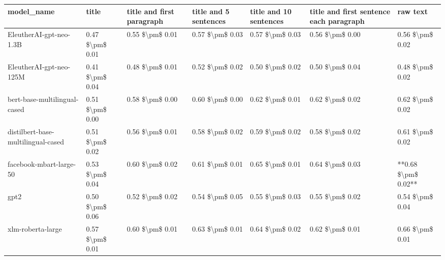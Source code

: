 \begin{tabular}{lllllll}
\toprule
                        model\_name &           title & title and first paragraph & title and 5 sentences & title and 10 sentences & title and first sentence each paragraph &            raw text \\
\midrule
           EleutherAI-gpt-neo-1.3B & 0.47 \$\textbackslash pm\$ 0.01 &           0.55 \$\textbackslash pm\$ 0.01 &       0.57 \$\textbackslash pm\$ 0.03 &        0.57 \$\textbackslash pm\$ 0.03 &                         0.56 \$\textbackslash pm\$ 0.00 &     0.56 \$\textbackslash pm\$ 0.02 \\
           EleutherAI-gpt-neo-125M & 0.41 \$\textbackslash pm\$ 0.04 &           0.48 \$\textbackslash pm\$ 0.01 &       0.52 \$\textbackslash pm\$ 0.02 &        0.50 \$\textbackslash pm\$ 0.02 &                         0.50 \$\textbackslash pm\$ 0.04 &     0.48 \$\textbackslash pm\$ 0.02 \\
      bert-base-multilingual-cased & 0.51 \$\textbackslash pm\$ 0.00 &           0.58 \$\textbackslash pm\$ 0.00 &       0.60 \$\textbackslash pm\$ 0.00 &        0.62 \$\textbackslash pm\$ 0.01 &                         0.62 \$\textbackslash pm\$ 0.02 &     0.62 \$\textbackslash pm\$ 0.02 \\
distilbert-base-multilingual-cased & 0.51 \$\textbackslash pm\$ 0.02 &           0.56 \$\textbackslash pm\$ 0.01 &       0.58 \$\textbackslash pm\$ 0.02 &        0.59 \$\textbackslash pm\$ 0.02 &                         0.58 \$\textbackslash pm\$ 0.02 &     0.61 \$\textbackslash pm\$ 0.02 \\
           facebook-mbart-large-50 & 0.53 \$\textbackslash pm\$ 0.04 &           0.60 \$\textbackslash pm\$ 0.02 &       0.61 \$\textbackslash pm\$ 0.01 &        0.65 \$\textbackslash pm\$ 0.01 &                         0.64 \$\textbackslash pm\$ 0.03 & **0.68 \$\textbackslash pm\$ 0.02** \\
                              gpt2 & 0.50 \$\textbackslash pm\$ 0.06 &           0.52 \$\textbackslash pm\$ 0.02 &       0.54 \$\textbackslash pm\$ 0.05 &        0.55 \$\textbackslash pm\$ 0.03 &                         0.55 \$\textbackslash pm\$ 0.02 &     0.54 \$\textbackslash pm\$ 0.04 \\
                 xlm-roberta-large & 0.57 \$\textbackslash pm\$ 0.01 &           0.60 \$\textbackslash pm\$ 0.01 &       0.63 \$\textbackslash pm\$ 0.01 &        0.64 \$\textbackslash pm\$ 0.02 &                         0.62 \$\textbackslash pm\$ 0.01 &     0.66 \$\textbackslash pm\$ 0.01 \\
\bottomrule
\end{tabular}
